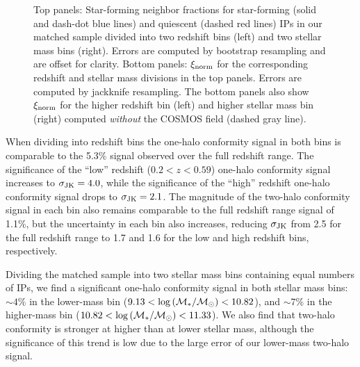 \begin{figure*}
  \epstrim{0.2in 0.3in 0.4in 0.8in}
  \caption{
Top panels: Star-forming neighbor fractions for star-forming (solid and dash-dot blue lines) and quiescent (dashed red lines) IPs in our matched sample divided into two redshift bins (left) and two stellar mass bins (right).  Errors are computed by bootstrap resampling and are offset for clarity.
Bottom panels: $\signorm$ for the corresponding redshift and stellar mass divisions in the top panels.  Errors are computed by jackknife resampling.
The bottom panels also show $\signorm$ for the higher redshift bin (left) and higher stellar mass bin (right) computed \emph{without} the COSMOS field (dashed gray line).
}
  \label{fig:latefrac_normsig_compare}
\end{figure*}

When dividing into redshift bins the one-halo conformity signal in both bins is comparable to the 5.3\% signal observed over the full redshift range.
The significance of the ``low'' redshift (${0.2<z<0.59}$) one-halo conformity signal increases to 
${\sigmaJK=4.0}$, while the significance of the ``high'' redshift one-halo conformity signal drops to ${\sigmaJK=2.1}$.
The magnitude of the two-halo conformity signal in each bin also remains comparable to the full redshift range signal of 1.1\%, but the uncertainty in each bin also increases,
reducing $\sigmaJK$ from 2.5 for the full redshift range to 1.7 and 1.6 for the low and high redshift bins, respectively.

Dividing the matched sample into two stellar mass bins containing equal numbers of IPs, we find a significant one-halo conformity signal in both stellar mass bins:~$\sim4$\% in the lower-mass bin ($9.13<\logM<10.82$), and $\sim7$\% in the higher-mass bin ($10.82<\logM<11.33$).
We also find that two-halo conformity is stronger at higher than at lower stellar mass, although the significance of this trend is low due to the large error of our lower-mass two-halo signal.

